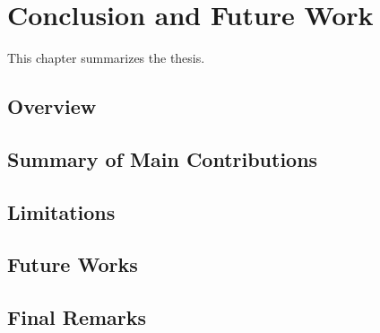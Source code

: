 \chapter{Conclusion and Future Work}\label{ch:conclusions}
This chapter summarizes the thesis. 
\section{Overview}
\section{Summary of Main Contributions}
\section{Limitations}
\section{Future Works}
\section{Final Remarks}